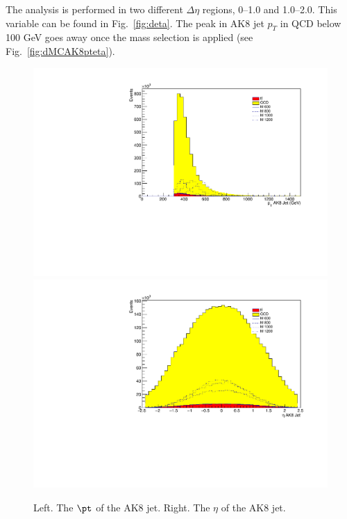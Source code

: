 The analysis is performed in two different $\Delta\eta$ regions, 0--1.0 and 1.0--2.0. This variable can be found in Fig.~\ref{fig:deta}. The peak in AK8 jet $p_{T}$ in QCD below 100 GeV goes away once the mass selection is applied (see Fig.~\ref{fig:dMCAK8pteta}).

\begin{figure}[thb!]
\begin{center}
\includegraphics[scale=0.34]{F5/shapeptFJ.pdf}
\includegraphics[scale=0.34]{F5/shapeetaFJ.pdf}\\
\end{center}
\caption{Left. The $\pt$ of the AK8 jet. Right. The $\eta$ of the AK8 jet.}
\label{fig:AK8pteta}
\end{figure} 

